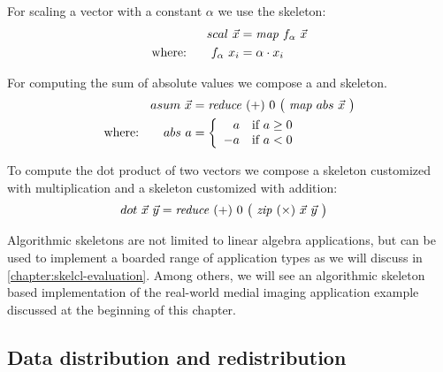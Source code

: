 For scaling a vector with a constant $\alpha$ we use the \map skeleton:
\begin{align*}
  scal\ \vec{x}&= \text{\textit{map}}\ f_{\alpha}\ \vec{x}\\
  \text{where:} \qquad f_{\alpha}\ x_i &= \alpha \cdot x_i
\end{align*}

\noindent
For computing the sum of absolute values we compose a \map and \reduce skeleton.
\begin{align*}
  asum\ \vec{x} &= \text{\textit{reduce}}\ (+)\ 0\ \big(\ \text{\textit{map}}\ abs\ \vec{x}\ \big)\\
  \text{where:} \qquad abs\ a &=
    \left\{
      \begin{array}{r l}
      a & \text{if } a \geq 0\\
      -a & \text{if } a < 0
      \end{array}
    \right.
\end{align*}

\noindent
To compute the dot product of two vectors we compose a \zip skeleton customized with multiplication and a \reduce skeleton customized with addition:
\begin{align*}
  dot\ \vec{x}\ \vec{y} &= \text{\textit{reduce}}\ (+)\ 0\ \big(\ \text{\textit{zip}}\ (\times)\ \vec{x}\ \vec{y}\ \big)
\end{align*}

\noindent
Algorithmic skeletons are not limited to linear algebra applications, but can be used to implement a boarded range of application types as we will discuss in \autoref{chapter:skelcl-evaluation}.
Among others, we will see an algorithmic skeleton based implementation of the real-world medial imaging application example discussed at the beginning of this chapter.


\subsection{Data distribution and redistribution}
\label{section:skelcl-programming-model:distribution}

